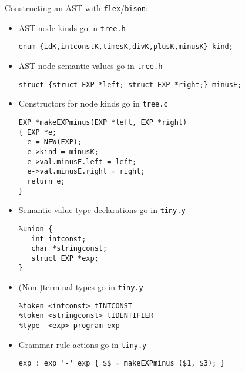 \begin{slide*}
Constructing an AST with {\tt flex}/{\tt bison}:
\begin{itemize}
\item AST node kinds go in {\tt tree.h}
\begin{scriptsize}
\begin{verbatim}
enum {idK,intconstK,timesK,divK,plusK,minusK} kind;
\end{verbatim}
\end{scriptsize}
\item AST node semantic values go in {\tt tree.h}
\begin{scriptsize}
\begin{verbatim}
struct {struct EXP *left; struct EXP *right;} minusE;
\end{verbatim}
\end{scriptsize}
\item Constructors for node kinds go in {\tt tree.c}
\begin{scriptsize}
\begin{verbatim}
EXP *makeEXPminus(EXP *left, EXP *right)
{ EXP *e;  
  e = NEW(EXP);
  e->kind = minusK;
  e->val.minusE.left = left;
  e->val.minusE.right = right;
  return e;
}
\end{verbatim}
\end{scriptsize}
\item Semantic value type declarations go in {\tt tiny.y}
\begin{scriptsize}
\begin{verbatim}
%union {
   int intconst;
   char *stringconst;
   struct EXP *exp;
}
\end{verbatim}
\end{scriptsize}
\item (Non-)terminal types go in {\tt tiny.y}
\begin{scriptsize}
\begin{verbatim}
%token <intconst> tINTCONST
%token <stringconst> tIDENTIFIER 
%type  <exp> program exp
\end{verbatim}
\end{scriptsize}
\item Grammar rule actions go in {\tt tiny.y}
\begin{scriptsize}
\begin{verbatim}
exp : exp '-' exp { $$ = makeEXPminus ($1, $3); }
\end{verbatim}
\end{scriptsize}
\end{itemize}
\vfil
\end{slide*}

